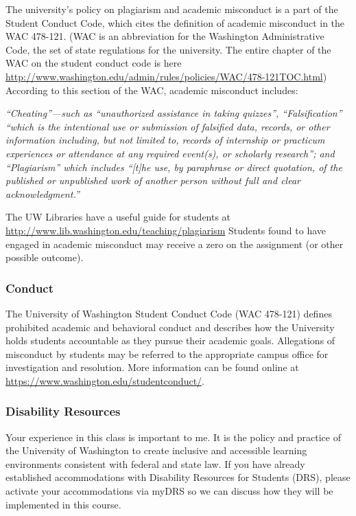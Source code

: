 \documentclass[
]{article}
\begin{document}
The university's policy on plagiarism and academic misconduct is a part
of the Student Conduct Code, which cites the definition of academic
misconduct in the WAC 478-121. (WAC is an abbreviation for the
Washington Administrative Code, the set of state regulations for the
university. The entire chapter of the WAC on the student conduct code is
here
\url{http://www.washington.edu/admin/rules/policies/WAC/478-121TOC.html})
According to this section of the WAC, academic misconduct includes:

\emph{``Cheating''---such as ``unauthorized assistance in taking
quizzes'', ``Falsification'' ``which is the intentional use or
submission of falsified data, records, or other information including,
but not limited to, records of internship or practicum experiences or
attendance at any required event(s), or scholarly research''; and
``Plagiarism'' which includes ``{[}t{]}he use, by paraphrase or direct
quotation, of the published or unpublished work of another person
without full and clear acknowledgment.''}

The UW Libraries have a useful guide for students at
\url{http://www.lib.washington.edu/teaching/plagiarism} Students found
to have engaged in academic misconduct may receive a zero on the
assignment (or other possible outcome).

\hypertarget{conduct}{%
\subsubsection{Conduct}\label{conduct}}

The University of Washington Student Conduct Code (WAC 478-121) defines
prohibited academic and behavioral conduct and describes how the
University holds students accountable as they pursue their academic
goals. Allegations of misconduct by students may be referred to the
appropriate campus office for investigation and resolution. More
information can be found online at
\url{https://www.washington.edu/studentconduct/}.

\hypertarget{disability-resources}{%
\subsubsection{Disability Resources}\label{disability-resources}}

Your experience in this class is important to me. It is the policy and
practice of the University of Washington to create inclusive and
accessible learning environments consistent with federal and state law.
If you have already established accommodations with Disability Resources
for Students (DRS), please activate your accommodations via myDRS so we
can discuss how they will be implemented in this course.
\end{document}
